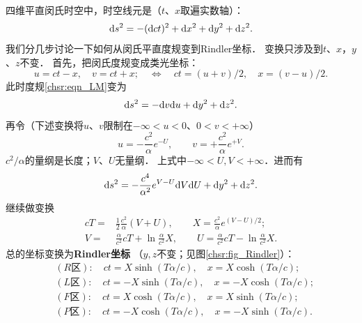 四维平直闵氏时空中，时空线元是（$t$、$x$取遍实数轴）：
\begin{equation}\label{chsr:eqn_LM}
    {\rm d}s^2 = - ({\rm d}ct)^2 +{\rm d}x^2 +{\rm d}y^2 +{\rm d}z^2 .
\end{equation}
我们分几步讨论一下如何从闵氏平直度规变到Rindler坐标．
变换只涉及到$t$、$x$，$y$、$z$不变．
首先，把闵氏度规变成类光坐标：
\begin{equation}
    u= ct - x, \quad v= ct + x;
    \quad \Leftrightarrow \quad
    ct = (u+v)/2, \quad x= (v-u)/2 .
\end{equation}
此时度规\eqref{chsr:eqn_LM}变为
\begin{equation}
    {\rm d}s^2 = - {\rm d}v{\rm d}u +{\rm d}y^2 +{\rm d}z^2 .
\end{equation}
再令（下述变换将$u$、$v$限制在$-\infty <u<0$、$0<v<+\infty$）
\begin{equation}
    u=-\frac{c^2}{\alpha}e^{-U},\qquad v=+\frac{c^2}{\alpha}e^{+V} .
\end{equation}
${c^2}/{\alpha}$的量纲是{\kaishu 长度}；$V$、$U$无量纲．
上式中$-\infty< U, V <+\infty$．进而有
\begin{equation}
    {\rm d}s^2 = - \frac{c^4}{\alpha^2}e^{V-U}{\rm d}V{\rm d}U +{\rm d}y^2 +{\rm d}z^2 .
\end{equation}
继续做变换
\begin{equation}
\begin{aligned}
    cT=&\frac{1}{2}\frac{c^2}{\alpha}(V+U),\qquad X= \frac{c^2}{\alpha}e^{(V-U)/2} ; \\ 
    V=& \frac{\alpha}{c^2} cT+ \ln \frac{\alpha}{c^2}X, \qquad 
    U= \frac{\alpha}{c^2} cT - \ln \frac{\alpha}{c^2}X .
\end{aligned}    
\end{equation}
总的坐标变换为{\heiti \bfseries Rindler坐标}
\cite[\S 12.4]{rindler-2006}（$y,z$不变；见图\ref{chsr:fig_Rindler}）：
\begin{subequations}\label{chsr:eqn_Rindler-trans}
    \begin{align}
        &(R \text{区}) : \quad  ct=  X \sinh(T \alpha/c ), \quad x=  X\cosh (T \alpha/c) ; \\
        &(L \text{区}) : \quad  ct= -X \sinh(T \alpha/c ), \quad x= -X\cosh (T \alpha/c) ; \\
        &(F \text{区}) : \quad  ct=  X \cosh(T \alpha/c ), \quad x=  X\sinh (T \alpha/c) ; \\
        &(P \text{区}) : \quad  ct= -X \cosh(T \alpha/c ), \quad x= -X\sinh (T \alpha/c) .
    \end{align}
\end{subequations}
